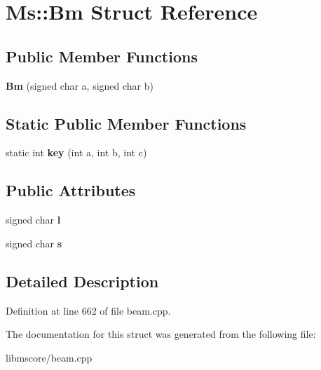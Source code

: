 \hypertarget{struct_ms_1_1_bm}{}\section{Ms\+:\+:Bm Struct Reference}
\label{struct_ms_1_1_bm}
\subsection*{Public Member Functions}
\begin{DoxyCompactItemize}
\item 
\mbox{\label{struct_ms_1_1_bm_a636a5a310de19b288025fe78b020fa08}} 
{\bfseries Bm} (signed char a, signed char b)
\end{DoxyCompactItemize}
\subsection*{Static Public Member Functions}
\begin{DoxyCompactItemize}
\item 
\mbox{\label{struct_ms_1_1_bm_af7b90e5c48dedf6484f0059642d57df6}} 
static int {\bfseries key} (int a, int b, int c)
\end{DoxyCompactItemize}
\subsection*{Public Attributes}
\begin{DoxyCompactItemize}
\item 
\mbox{\label{struct_ms_1_1_bm_a49e235ce937b671a5c16570a62c4f0e5}} 
signed char {\bfseries l}
\item 
\mbox{\label{struct_ms_1_1_bm_aa6a6ebe1992db9c1d22651e401301952}} 
signed char {\bfseries s}
\end{DoxyCompactItemize}


\subsection{Detailed Description}


Definition at line 662 of file beam.\+cpp.



The documentation for this struct was generated from the following file\+:\begin{DoxyCompactItemize}
\item 
libmscore/beam.\+cpp\end{DoxyCompactItemize}
